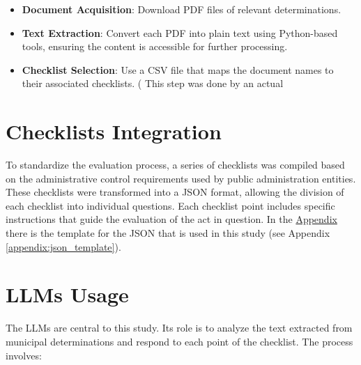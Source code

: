 \documentclass[../main.tex]{subfiles}
\begin{document}
\begin{itemize}
    \item \textbf{Document Acquisition}: Download PDF files of relevant determinations.
    \item \textbf{Text Extraction}: Convert each PDF into plain text using Python-based tools, ensuring the content is accessible for further processing.
    \item \textbf{Checklist Selection}: Use a CSV file that maps the document names to their associated checklists. ( This step was done by an actual
\end{itemize}

\section{Checklists Integration}
To standardize the evaluation process, a series of checklists was compiled based on the administrative control requirements used by public administration entities. These checklists were transformed into a JSON format, allowing the division of each checklist into individual questions. Each checklist point includes specific instructions that guide the evaluation of the act in question. In the \hyperref[appendix:json_template]{Appendix} there is the template for the JSON that is used in this study (see Appendix \ref{appendix:json_template}).

\section{LLMs Usage}
The LLMs are central to this study. Its role is to analyze the text extracted from municipal determinations and respond to each point of the checklist. The process involves:
\end{document}

